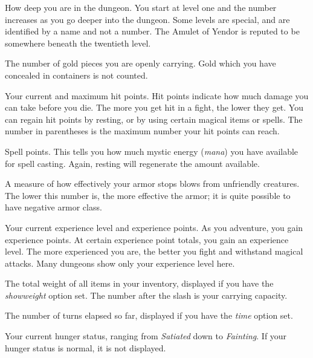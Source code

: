\item[\bb{Dungeon Level}]
How deep you are in the dungeon.  You start at level one and the number
increases as you go deeper into the dungeon.  Some levels are special,
and are identified by a name and not a number.  The Amulet of Yendor is
reputed to be somewhere beneath the twentieth level.

\item[\bb{Gold}]
The number of gold pieces you are openly carrying.  Gold which you have
concealed in containers is not counted.

\item[\bb{Hit Points}]
Your current and maximum hit points.  Hit points indicate how much
damage you can take before you die.  The more you get hit in a fight,
the lower they get.  You can regain hit points by resting, or by using
certain magical items or spells.  The number in parentheses is the maximum
number your hit points can reach.

\item[\bb{Power}]
Spell points.  This tells you how much mystic energy ({\it mana\/})
you have available for spell casting.  Again, resting will regenerate the
amount available.

\item[\bb{Armor Class}]
A measure of how effectively your armor stops blows from unfriendly
creatures.  The lower this number is, the more effective the armor; it
is quite possible to have negative armor class. 

\item[\bb{Experience}]
Your current experience level and experience points.  As you
adventure, you gain experience points.  At certain experience point
totals, you gain an experience level.  The more experienced you are,
the better you fight and withstand magical attacks.  Many dungeons
show only your experience level here.

\item[\bb{Weight}]
The total weight of all items in your inventory, displayed if you have the
{\it showweight\/} 
option set. The number after the slash is your carrying capacity.

\item[\bb{Time}]
The number of turns elapsed so far, displayed if you have the
{\it time\/} 
option set.

\item[\bb{Hunger status}]
Your current hunger status, ranging from {\it Satiated\/} down to
{\it Fainting}.  If your hunger status is normal, it is not displayed.
\elist
\nd %

